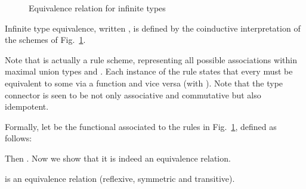\begin{figure}[t] 
\caption{Equivalence relation for infinite types}
\label{fig:equivalenceSchemesCo}
\end{figure}

\begin{definition}
Infinite type equivalence, written , is defined by the
coinductive interpretation of the schemes of
Fig.~\ref{fig:equivalenceSchemesCo}.
\end{definition}

Note that  is actually a rule scheme, representing all
possible associations within maximal union types  and .
Each instance of the rule states that every  must be equivalent to some
 via a function  and vice versa (with ). Note that the  type connector  is seen to be not only
associative and commutative but also idempotent.

Formally, let  be the functional associated to the rules in
Fig.~\ref{fig:equivalenceSchemesCo}, defined as follows: 

Then . Now we show that it is
indeed an equivalence relation.



\begin{lemma}
 is an equivalence relation (\ie reflexive, symmetric and
transitive).
\end{lemma}

